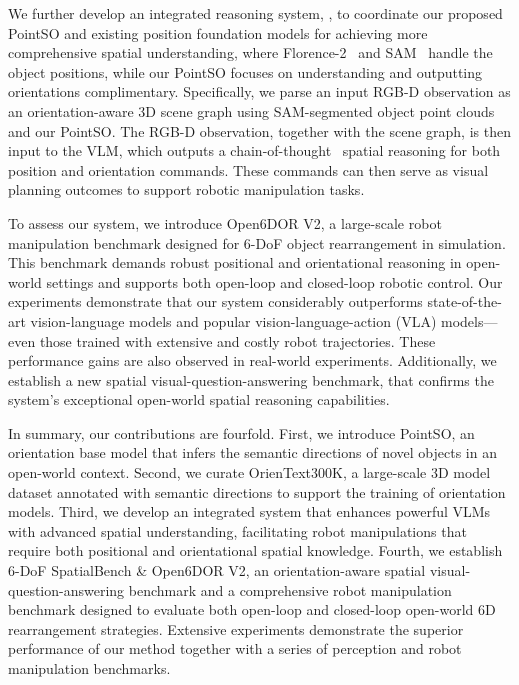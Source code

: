 We further develop an integrated reasoning system, \sofar, to coordinate our proposed PointSO and existing position foundation models for achieving more comprehensive spatial understanding, where Florence-2~\cite{florence2} and SAM~\cite{SAM23} handle the object positions, while our PointSO focuses on understanding and outputting orientations complimentary. Specifically, we parse an input RGB-D observation as an orientation-aware 3D scene graph using SAM-segmented object point clouds and our PointSO. The RGB-D observation, together with the scene graph, is then input to the VLM, which outputs a chain-of-thought~\cite{CoT22} spatial reasoning for both position and orientation commands. These commands can then serve as visual planning outcomes to support robotic manipulation tasks.

To assess our system, we introduce Open6DOR V2, a large-scale robot manipulation benchmark designed for 6-DoF object rearrangement in simulation. This benchmark demands robust positional and orientational reasoning in open-world settings and supports both open-loop and closed-loop robotic control. Our experiments demonstrate that our system considerably outperforms state-of-the-art vision-language models and popular vision-language-action (VLA) models—even those trained with extensive and costly robot trajectories. These performance gains are also observed in real-world experiments. Additionally, we establish a new spatial visual-question-answering benchmark, that confirms the system’s exceptional open-world spatial reasoning capabilities.

In summary, our contributions are fourfold. First, we introduce PointSO, an orientation base model that infers the semantic directions of novel objects in an open-world context. Second, we curate OrienText300K, a large-scale 3D model dataset annotated with semantic directions to support the training of orientation models. Third, we develop an integrated system that enhances powerful VLMs with advanced spatial understanding, facilitating robot manipulations that require both positional and orientational spatial knowledge. Fourth, we establish 6-DoF SpatialBench \& Open6DOR V2, an orientation-aware spatial visual-question-answering benchmark and a comprehensive robot manipulation benchmark designed to evaluate both open-loop and closed-loop open-world 6D rearrangement strategies. Extensive experiments demonstrate the superior performance of our method together with a series of perception and robot manipulation benchmarks.